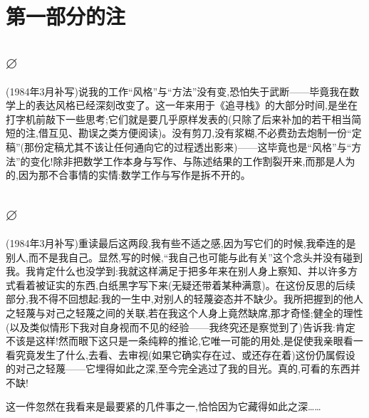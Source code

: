 \chapter{第一部分的注}


\section{$\varnothing$}

(1984年3月补写)说我的工作“风格”与“方法”没有变,恐怕失于武断——毕竟我在数学上的表达风格已经深刻改变了。这一年来用于《追寻栈》的大部分时间,是坐在打字机前敲下一些思考;它们就是要几乎原样发表的(只除了后来补加的若干相当简短的注,借互见、勘误之类方便阅读)。没有剪刀,没有浆糊,不必费劲去炮制一份“定稿”(那份定稿尤其不该让任何通向它的过程透出影来)——这毕竟也是“风格”与“方法”的变化!除非把数学工作本身与写作、与陈述结果的工作割裂开来,而那是人为的,因为那不合事情的实情:数学工作与写作是拆不开的。

\section{$\varnothing$}

(1984年3月补写)重读最后这两段,我有些不适之感,因为写它们的时候,我牵连的是别人,而不是我自己。显然,写的时候,“我自己也可能与此有关”这个念头并没有碰到我。我肯定什么也没学到:我就这样满足于把多年来在别人身上察知、并以许多方式看着被证实的东西,白纸黑字写下来(无疑还带着某种满意)。在这份反思的后续部分,我不得不回想起:我的一生中,对别人的轻蔑姿态并不缺少。我所把握到的他人之轻蔑与对己之轻蔑之间的关联,若在我这个人身上竟然缺席,那才奇怪;健全的理性(以及类似情形下我对自身视而不见的经验——我终究还是察觉到了)告诉我:肯定不该是这样!然而眼下这只是一条纯粹的推论,它唯一可能的用处,是促使我亲眼看一看究竟发生了什么,去看、去审视(如果它确实存在过、或还存在着)这份仍属假设的对己之轻蔑——它埋得如此之深,至今完全逃过了我的目光。真的,可看的东西并不缺!

\pmark 这一件忽然在我看来是最要紧的几件事之一,恰恰因为它藏得如此之深……

